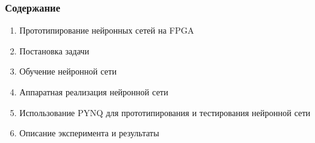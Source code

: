 \begin{frame}
\frametitle{Содержание}

\begin{enumerate}
    \item Прототипирование нейронных сетей на FPGA 
    \item Постановка задачи
    \item Обучение нейронной сети
    \item Аппаратная реализация нейронной сети
    \item Использование PYNQ для прототипирования и тестирования нейронной сети
    \item Описание эксперимента и результаты
\end{enumerate}

\end{frame}
